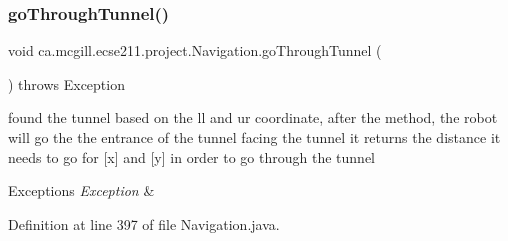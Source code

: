 \subsubsection{\texorpdfstring{go\+Through\+Tunnel()}{goThroughTunnel()}}
{\footnotesize\ttfamily void ca.\+mcgill.\+ecse211.\+project.\+Navigation.\+go\+Through\+Tunnel (\begin{DoxyParamCaption}{ }\end{DoxyParamCaption}) throws Exception}

found the tunnel based on the ll and ur coordinate, after the method, the robot will go the the entrance of the tunnel facing the tunnel it returns the distance it needs to go for \mbox{[}x\mbox{]} and \mbox{[}y\mbox{]} in order to go through the tunnel


\begin{DoxyExceptions}{Exceptions}
{\em Exception} & \\
\hline
\end{DoxyExceptions}


Definition at line 397 of file Navigation.\+java.


